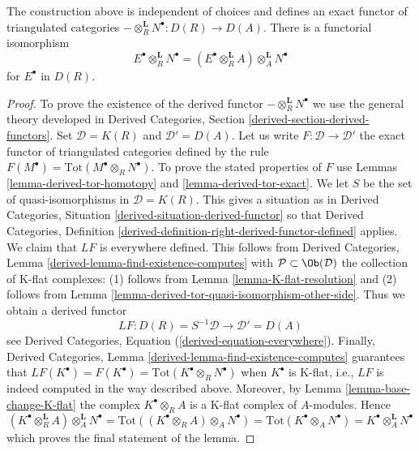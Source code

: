 \begin{lemma}
\label{lemma-derived-base-change}
The construction above is independent of choices and defines an exact
functor of triangulated categories
$- \otimes_R^\mathbf{L} N^\bullet : D(R) \to D(A)$.
There is a functorial isomorphism
$$
E^\bullet \otimes_R^\mathbf{L} N^\bullet =
(E^\bullet \otimes_R^\mathbf{L} A) \otimes_A^\mathbf{L} N^\bullet
$$
for $E^\bullet$ in $D(R)$.
\end{lemma}

\begin{proof}
To prove the existence of the derived functor
$- \otimes_R^\mathbf{L} N^\bullet$
we use the general theory developed in
Derived Categories, Section \ref{derived-section-derived-functors}.
Set $\mathcal{D} = K(R)$ and $\mathcal{D}' = D(A)$.
Let us write $F : \mathcal{D} \to \mathcal{D}'$ the exact functor
of triangulated categories defined by the rule
$F(M^\bullet) = \text{Tot}(M^\bullet \otimes_R N^\bullet)$.
To prove the stated properties of $F$ use
Lemmas \ref{lemma-derived-tor-homotopy} and \ref{lemma-derived-tor-exact}.
We let $S$ be the set of
quasi-isomorphisms in $\mathcal{D} = K(R)$.
This gives a situation as in
Derived Categories, Situation \ref{derived-situation-derived-functor}
so that
Derived Categories, Definition
\ref{derived-definition-right-derived-functor-defined}
applies. We claim that $LF$ is everywhere defined.
This follows from
Derived Categories, Lemma \ref{derived-lemma-find-existence-computes}
with $\mathcal{P} \subset \Ob(\mathcal{D})$ the collection
of K-flat complexes: (1) follows from
Lemma \ref{lemma-K-flat-resolution}
and (2) follows from
Lemma \ref{lemma-derived-tor-quasi-isomorphism-other-side}.
Thus we obtain a derived functor
$$
LF : D(R) = S^{-1}\mathcal{D} \longrightarrow \mathcal{D}' = D(A)
$$
see
Derived Categories, Equation (\ref{derived-equation-everywhere}).
Finally,
Derived Categories, Lemma \ref{derived-lemma-find-existence-computes}
guarantees that $LF(K^\bullet) = F(K^\bullet) =
\text{Tot}(K^\bullet \otimes_R N^\bullet)$
when $K^\bullet$ is K-flat, i.e., $LF$ is indeed computed in the way
described above. Moreover, by Lemma \ref{lemma-base-change-K-flat}
the complex $K^\bullet \otimes_R A$ is a K-flat complex of $A$-modules.
Hence
$$
(K^\bullet \otimes_R^\mathbf{L} A) \otimes_A^\mathbf{L} N^\bullet =
\text{Tot}((K^\bullet \otimes_R A) \otimes_A N^\bullet) =
\text{Tot}(K^\bullet \otimes_A N^\bullet) =
K^\bullet \otimes_A^\mathbf{L} N^\bullet
$$
which proves the final statement of the lemma.
\end{proof}

